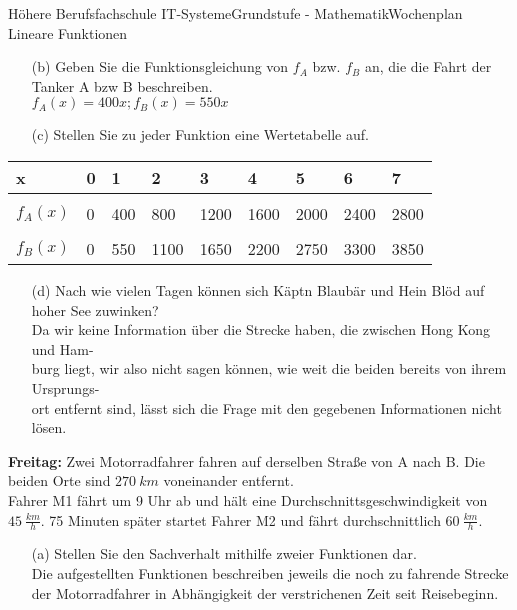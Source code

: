 \documentclass[oneside,openany,headings=optiontotoc,11pt,numbers=noenddot]{scrreprt}
\begin{document}
\begin{worksheet}{Höhere Berufsfachschule IT-Systeme}{Grundstufe - Mathematik}{Wochenplan Lineare Funktionen}
\begin{framed}
\begin{itemize}
				\item[(b)] Geben Sie die Funktionsgleichung von \(f_A\) bzw. \(f_B\) an, die die Fahrt der Tanker A bzw B beschreiben.\\
				\colorbox{green!10}{\(f_A(x) = 400x; f_B(x) = 550x\)}
				\item[(c)] Stellen Sie zu jeder Funktion eine Wertetabelle auf.
			\end{itemize}
			\begin{tabularx}{\textwidth}{l|l|l|l|l|l|l|l|l}
				x & 0 & 1 & 2 & 3 & 4 & 5 & 6 & 7\\
				\hline
				& & & & & & & &\\
				\(f_A(x)\) & 0 & 400 & 800 & 1200 & 1600 & 2000 & 2400 & 2800\\
				\hline
				& & & & & & & &\\
				\(f_B(x)\) & 0 & 550 & 1100 & 1650 & 2200 & 2750 & 3300 & 3850\\
			\end{tabularx}
			\begin{itemize}
				\item[(d)] Nach wie vielen Tagen können  sich Käpt\grq{}n Blaubär und Hein Blöd auf hoher See zuwinken?\\
				\colorbox{red!10}{Da wir keine Information über die Strecke haben, die zwischen Hong Kong und Ham-}\\
				\colorbox{red!10}{burg liegt, wir also nicht sagen können, wie weit die beiden bereits von ihrem Ursprungs-}\\
				\colorbox{red!10}{ort entfernt sind, lässt sich die Frage mit den gegebenen Informationen nicht lösen.}
			\end{itemize}
		\end{framed}
		\begin{framed}
			\noindent
			\textbf{Freitag:} Zwei Motorradfahrer fahren auf derselben Straße von A nach B. Die beiden Orte sind \(270\ km\) voneinander entfernt.\\
			Fahrer M1 fährt um 9 Uhr ab und hält eine Durchschnittsgeschwindigkeit von \(45\ \frac{km}{h}\). 75 Minuten später startet Fahrer M2 und fährt durchschnittlich \(60\ \frac{km}{h}\).
			\begin{itemize}
				\item[(a)] Stellen Sie den Sachverhalt mithilfe zweier Funktionen dar.\\
				Die aufgestellten Funktionen beschreiben jeweils die noch zu fahrende Strecke der Motorradfahrer in Abhängigkeit der verstrichenen Zeit seit Reisebeginn.\\

\end{itemize}
\end{framed}
\end{worksheet}
\end{document}

